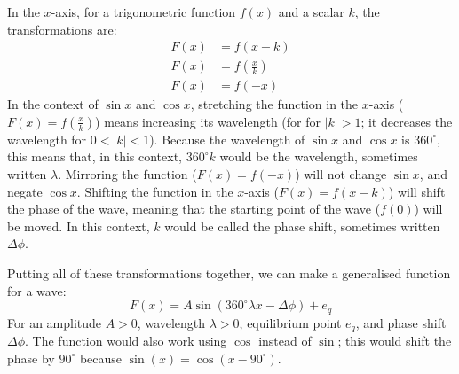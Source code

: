             In the $x$-axis, for a trigonometric function $f(x)$ and a scalar $k$, the transformations are:
            \begin{align}
                F(x)&=f(x-k) \\
                F(x)&=f\left(\frac{x}{k}\right) \\
                F(x)&=f(-x)
            \end{align}
            In the context of $\sin x$ and $\cos x$, stretching the function in the $x$-axis ($F(x)=f\left(\frac{x}{k}\right)$) means increasing its wavelength (for for $|k|>1$; it decreases the wavelength for $0<|k|<1$).
            Because the wavelength of $\sin x$ and $\cos x$ is $360^\circ$, this means that, in this context, $360^\circ k$ would be the wavelength, sometimes written $\lambda$.
            Mirroring the function ($F(x)=f(-x)$) will not change $\sin x$, and negate $\cos x$.
            Shifting the function in the $x$-axis ($F(x)=f(x-k)$) will shift the phase of the wave, meaning that the starting point of the wave ($f(0)$) will be moved.
            In this context, $k$ would be called the phase shift, sometimes written $\Delta\phi$.

            Putting all of these transformations together, we can make a generalised function for a wave:
            \begin{equation}
                F(x)=A\sin(360^\circ \lambda x-\Delta\phi)+e_q
            \end{equation}
            For an amplitude $A>0$, wavelength $\lambda>0$, equilibrium point $e_q$, and phase shift $\Delta\phi$.
            The function would also work using $\cos$ instead of $\sin$; this would shift the phase by $90^\circ$ because $\sin(x)=\cos(x-90^\circ)$.

